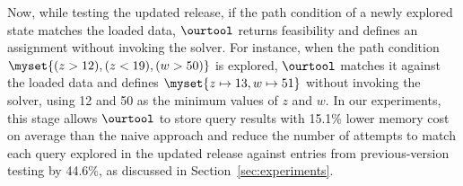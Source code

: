 Now, while testing the updated release, if the path condition of a newly explored state matches the loaded data, $\ourtool$ returns feasibility and defines an assignment without invoking the solver. For instance, when the path condition $\myset{(z > 12), (z < 19), (w > 50)}$ is explored, $\ourtool$ matches it against the loaded data and defines $\myset{z \mapsto 13, w \mapsto 51}$ without invoking the solver, using 12 and 50 as the minimum values of $z$ and $w$. In our experiments, this stage allows $\ourtool$ to store query results with 15.1\% lower memory cost on average than the naive approach and reduce the number of attempts to match each query explored in the updated release against entries from previous-version testing by 44.6\%, as discussed in Section~\ref{sec:experiments}. 
\fi